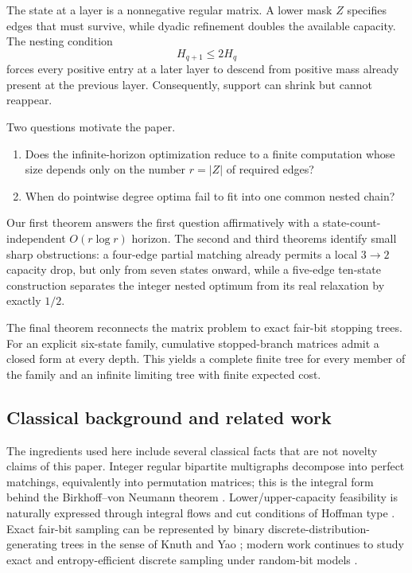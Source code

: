 \documentclass[11pt]{article}
\theoremstyle{definition}
\begin{document}
The state at a layer is a nonnegative regular matrix.  A lower mask $Z$ specifies edges that must
survive, while dyadic refinement doubles the available capacity.  The nesting condition
\[
H_{q+1}\le 2H_q
\]
forces every positive entry at a later layer to descend from positive mass already present at the
previous layer.  Consequently, support can shrink but cannot reappear.

Two questions motivate the paper.

\begin{enumerate}[label=(\roman*)]
\item Does the infinite-horizon optimization reduce to a finite computation whose size depends
only on the number $r=|Z|$ of required edges?
\item When do pointwise degree optima fail to fit into one common nested chain?
\end{enumerate}

Our first theorem answers the first question affirmatively with a state-count-independent
$O(r\log r)$ horizon.  The second and third theorems identify small sharp obstructions:
a four-edge partial matching already permits a local $3\to2$ capacity drop, but only from seven
states onward, while a five-edge ten-state construction separates the integer nested optimum from
its real relaxation by exactly $1/2$.

The final theorem reconnects the matrix problem to exact fair-bit stopping trees.  For an explicit
six-state family, cumulative stopped-branch matrices admit a closed form at every depth.  This
yields a complete finite tree for every member of the family and an infinite limiting tree with
finite expected cost.

\subsection{Classical background and related work}

The ingredients used here include several classical facts that are not novelty claims of this
paper.  Integer regular bipartite multigraphs decompose into perfect matchings, equivalently into
permutation matrices; this is the integral form behind the Birkhoff--von Neumann theorem
\cite{birkhoff1946,vonneumann1953}.  Lower/upper-capacity feasibility is naturally expressed
through integral flows and cut conditions of Hoffman type \cite{hoffman1974,bangjensengutin2009}.
Exact fair-bit sampling can be represented by binary discrete-distribution-generating trees in
the sense of Knuth and Yao \cite{knuthyao1976}; modern work continues to study exact and
entropy-efficient discrete sampling under random-bit models \cite{saad2020optimal}.
\end{document}
